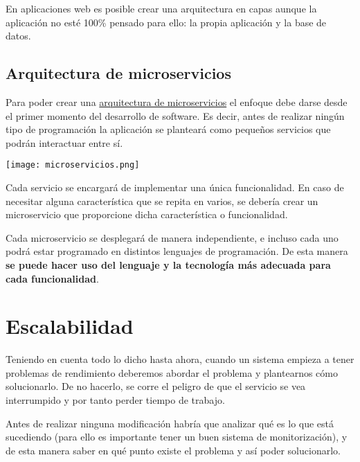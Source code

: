 
En aplicaciones web es posible crear una arquitectura en capas aunque la aplicación no esté 100\% pensado para ello: la propia aplicación y la base de datos.


\section{Arquitectura de microservicios}

Para poder crear una \href{https://es.wikipedia.org/wiki/Arquitectura_de_microservicios}{arquitectura de microservicios} el enfoque debe darse desde el primer momento del desarrollo de software. Es decir, antes de realizar ningún tipo de programación la aplicación se planteará como pequeños servicios que podrán interactuar entre sí.


\begin{center}
    \texttt{[image: microservicios.png]}
\end{center}

Cada servicio se encargará de implementar una única funcionalidad. En caso de necesitar alguna característica que se repita en varios, se debería crear un microservicio que proporcione dicha característica o funcionalidad.


Cada microservicio se desplegará de manera independiente, e incluso cada uno podrá estar programado en distintos lenguajes de programación. De esta manera \textbf{se puede hacer uso del lenguaje y la tecnología más adecuada para cada funcionalidad}.



\chapter{Escalabilidad}

Teniendo en cuenta todo lo dicho hasta ahora, cuando un sistema empieza a tener problemas de rendimiento deberemos abordar el problema y plantearnos cómo solucionarlo. De no hacerlo, se corre el peligro de que el servicio se vea interrumpido y por tanto perder tiempo de trabajo.

Antes de realizar ninguna modificación habría que analizar qué es lo que está sucediendo (para ello es importante tener un buen sistema de monitorización), y de esta manera saber en qué punto existe el problema y así poder solucionarlo.

